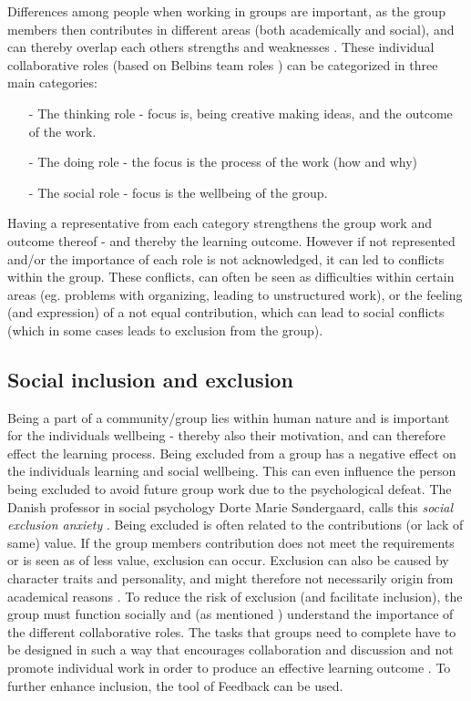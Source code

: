 Differences among people when working in groups are important, as the group members then contributes in different areas (both academically and social), and can thereby overlap each others strengths and weaknesses \cite{ProjektarbejdesKompleksitet}. These individual collaborative roles (based on Belbins team roles \cite{ProjektarbejdesKompleksitet}) can be categorized in three main categories: 
\begin{itemize}
	\item[-] The thinking role - focus is, being creative making ideas, and the outcome of the work. 
	\item[-] The doing role - the focus is the process of the work (how and why)
	\item[-] The social role - focus is the wellbeing of the group. 
\end{itemize}

Having a representative from each category strengthens the group work and outcome thereof - and thereby the learning outcome\cite{ProjektarbejdesKompleksitet}. However if not represented and/or the importance of each role is not acknowledged, it can led to conflicts within the group. These conflicts, can often be seen as difficulties within certain areas (eg. problems with organizing, leading to unstructured work), or the feeling (and expression) of a not equal contribution, which can lead to social conflicts (which in some cases leads to exclusion from the group)\cite{ProjektarbejdesKompleksitet}. 

\subsection{Social inclusion and exclusion}
Being a part of a community/group lies within human nature and is important for the individuals wellbeing  \cite{ProjektarbejdesKompleksitet}- thereby also their motivation, and can therefore effect the learning process. Being excluded from a group has a negative effect on the individuals learning and social wellbeing. This can even influence the person being excluded to avoid future group work due to the psychological defeat. The Danish professor in social psychology Dorte Marie Søndergaard, calls this \textit{social exclusion anxiety} \cite{ProjektarbejdesKompleksitet}. Being excluded is often related to the contributions (or lack of same) value. If the group members contribution does not meet the requirements or is seen as of less value, exclusion can occur. Exclusion can also be caused by character traits and personality, and might therefore not necessarily origin from academical reasons \cite{ProjektarbejdesKompleksitet}.
To reduce the risk of exclusion (and facilitate inclusion), the group must function socially and (as mentioned ) understand the importance of the different collaborative roles. The tasks that groups need to complete have to be designed in such a way that encourages collaboration and discussion and not promote individual work in order to produce an effective learning outcome \cite{collaborationSocialPedagogy}. To further enhance inclusion, the tool of Feedback can be used. 


